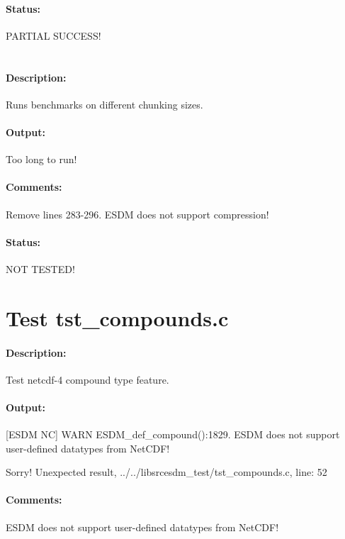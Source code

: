 \paragraph{Status:} PARTIAL SUCCESS!

\section{{\color{blue}{FIX ME! Test tst\_chunks3.c}}}

\paragraph{Description:} Runs benchmarks on different chunking sizes.

\paragraph{Output:} Too long to run!

\paragraph{Comments:} Remove lines 283-296. ESDM does not support compression!

\paragraph{Status:} NOT TESTED!

\section{Test tst\_compounds.c}

\paragraph{Description:} Test netcdf-4 compound type feature.

\paragraph{Output:} [ESDM NC] WARN ESDM\_def\_compound():1829. ESDM does not support user-defined datatypes from NetCDF!

Sorry! Unexpected result, ../../libsrcesdm\_test/tst\_compounds.c, line: 52

\paragraph{Comments:} ESDM does not support user-defined datatypes from NetCDF!

